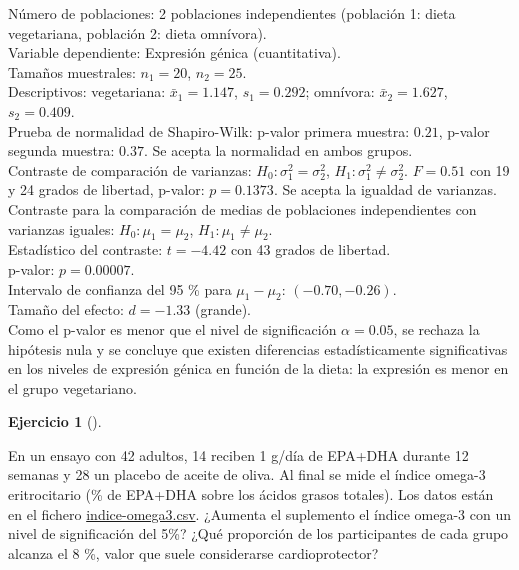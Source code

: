 \documentclass[
  spanish,
  a4paper,
]{scrreport}
\theoremstyle{definition}
\newtheorem{exercise}{Ejercicio}[chapter]
\theoremstyle{remark}
\begin{document}
\begin{tcolorbox}[enhanced jigsaw, arc=.35mm, bottomrule=.15mm, bottomtitle=1mm, breakable, colback=white, colbacktitle=quarto-callout-tip-color!10!white, colframe=quarto-callout-tip-color-frame, coltitle=black, left=2mm, leftrule=.75mm, opacityback=0, opacitybacktitle=0.6, rightrule=.15mm, title=\textcolor{quarto-callout-tip-color}{\faLightbulb}\hspace{0.5em}{Solución}, titlerule=0mm, toprule=.15mm, toptitle=1mm]

Número de poblaciones: 2 poblaciones independientes (población 1: dieta
vegetariana, población 2: dieta omnívora).\\
Variable dependiente: Expresión génica (cuantitativa).\\
Tamaños muestrales: \(n_1=20\), \(n_2=25\).\\
Descriptivos: vegetariana: \(\bar x_1=1.147\), \(s_1=0.292\); omnívora:
\(\bar x_2=1.627\), \(s_2=0.409\).\\
Prueba de normalidad de Shapiro-Wilk: p-valor primera muestra: \(0.21\),
p-valor segunda muestra: \(0.37\). Se acepta la normalidad en ambos
grupos.\\
Contraste de comparación de varianzas: \(H_0:\sigma_1^2=\sigma_2^2\),
\(H_1:\sigma_1^2\neq \sigma_2^2\). \(F=0.51\) con 19 y 24 grados de
libertad, p-valor: \(p=0.1373\). Se acepta la igualdad de varianzas.\\
Contraste para la comparación de medias de poblaciones independientes
con varianzas iguales: \(H_0:\mu_1=\mu_2\), \(H_1:\mu_1\neq\mu_2\).\\
Estadístico del contraste: \(t=-4.42\) con 43 grados de libertad.\\
p-valor: \(p=0.00007\).\\
Intervalo de confianza del 95 \% para \(\mu_1-\mu_2\):
\((-0.70, -0.26)\).\\
Tamaño del efecto: \(d=-1.33\) (grande).\\
Como el p-valor es menor que el nivel de significación \(\alpha=0.05\),
se rechaza la hipótesis nula y se concluye que existen diferencias
estadísticamente significativas en los niveles de expresión génica en
función de la dieta: la expresión es menor en el grupo vegetariano.

\end{tcolorbox}

\begin{exercise}[]\protect\hypertarget{exr-contraste-ia-comparacion-medias-omega3}{}\label{exr-contraste-ia-comparacion-medias-omega3}

En un ensayo con 42 adultos, 14 reciben 1 g/día de EPA+DHA durante 12
semanas y 28 un placebo de aceite de oliva. Al final se mide el índice
omega-3 eritrocitario (\% de EPA+DHA sobre los ácidos grasos totales).
Los datos están en el fichero
\href{datos/indice-omega3.csv}{indice-omega3.csv}. ¿Aumenta el
suplemento el índice omega-3 con un nivel de significación del 5\%? ¿Qué
proporción de los participantes de cada grupo alcanza el 8 \%, valor que
suele considerarse cardioprotector?

\end{exercise}
\end{document}
